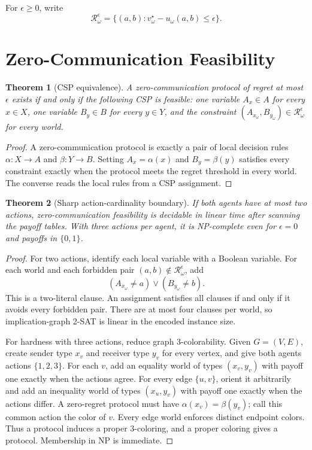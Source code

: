 \documentclass[letterpaper,10pt]{article}
\newtheorem{theorem}{Theorem}
\newcommand{\Rset}{\mathcal{R}}
\begin{document}
For $\epsilon\ge0$, write
\[
\Rset_\omega^\epsilon=\{(a,b):v_\omega^\star-u_\omega(a,b)\le\epsilon\}.
\]

\section{Zero-Communication Feasibility}

\begin{theorem}[CSP equivalence]\label{thm:csp}
A zero-communication protocol of regret at most $\epsilon$ exists if and only
if the following CSP is feasible: one variable $A_x\in A$ for every $x\in X$,
one variable $B_y\in B$ for every $y\in Y$, and the constraint
$(A_{x_\omega},B_{y_\omega})\in\Rset_\omega^\epsilon$ for every world.
\end{theorem}
\begin{proof}
A zero-communication protocol is exactly a pair of local decision rules
$\alpha:X\to A$ and $\beta:Y\to B$. Setting $A_x=\alpha(x)$ and
$B_y=\beta(y)$ satisfies every constraint exactly when the protocol meets the
regret threshold in every world. The converse reads the local rules from a CSP
assignment.
\end{proof}

\begin{theorem}[Sharp action-cardinality boundary]\label{thm:action-boundary}
If both agents have at most two actions, zero-communication feasibility is
decidable in linear time after scanning the payoff tables. With three actions
per agent, it is NP-complete even for $\epsilon=0$ and payoffs in $\{0,1\}$.
\end{theorem}
\begin{proof}
For two actions, identify each local variable with a Boolean variable. For each
world and each forbidden pair $(a,b)\notin\Rset_\omega^\epsilon$, add
\[
(A_{x_\omega}\ne a)\lor(B_{y_\omega}\ne b).
\]
This is a two-literal clause. An assignment satisfies all clauses if and only
if it avoids every forbidden pair. There are at most four clauses per world,
so implication-graph 2-SAT is linear in the encoded instance size.

For hardness with three actions, reduce graph 3-colorability. Given
$G=(V,E)$, create sender type $x_v$ and receiver type $y_v$ for every vertex,
and give both agents actions $\{1,2,3\}$. For each $v$, add an equality world
of types $(x_v,y_v)$ with payoff one exactly when the actions agree. For every
edge $\{u,v\}$, orient it arbitrarily and add an inequality world of types
$(x_u,y_v)$ with payoff one exactly when the actions differ. A zero-regret
protocol must have $\alpha(x_v)=\beta(y_v)$; call this common action the color
of $v$. Every edge world enforces distinct endpoint colors. Thus a protocol
induces a proper 3-coloring, and a proper coloring gives a protocol. Membership
in NP is immediate.
\end{proof}
\end{document}
